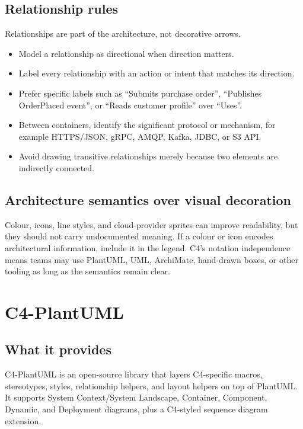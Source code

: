 \documentclass[11pt]{article}
\begin{document}
\subsection{Relationship rules}

Relationships are part of the architecture, not decorative arrows.\cite{c4notation}
\begin{itemize}
  \item Model a relationship as directional when direction matters.
  \item Label every relationship with an action or intent that matches its direction.
  \item Prefer specific labels such as ``Submits purchase order'', ``Publishes OrderPlaced event'', or ``Reads customer profile'' over ``Uses''.
  \item Between containers, identify the significant protocol or mechanism, for example HTTPS/JSON, gRPC, AMQP, Kafka, JDBC, or S3 API.
  \item Avoid drawing transitive relationships merely because two elements are indirectly connected.
\end{itemize}

\subsection{Architecture semantics over visual decoration}

Colour, icons, line styles, and cloud-provider sprites can improve readability, but they should not carry undocumented meaning. If a colour or icon encodes architectural information, include it in the legend. C4's notation independence means teams may use PlantUML, UML, ArchiMate, hand-drawn boxes, or other tooling as long as the semantics remain clear.\cite{c4home,c4notation}

\section{C4-PlantUML}

\subsection{What it provides}

C4-PlantUML is an open-source library that layers C4-specific macros, stereotypes, styles, relationship helpers, and layout helpers on top of PlantUML. It supports System Context/System Landscape, Container, Component, Dynamic, and Deployment diagrams, plus a C4-styled sequence diagram extension.\cite{c4plantuml}
\end{document}
